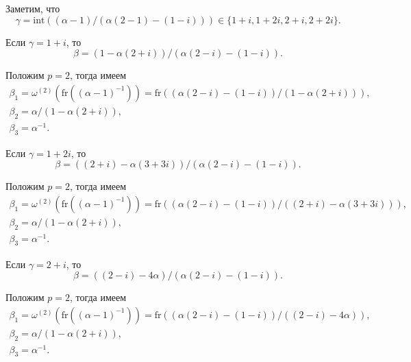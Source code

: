 \documentclass[_00_autoref.tex]{subfiles}
\begin{document}
\begin{example}
    Заметим, что
    \begin{equation*}
        \gamma=\textrm{int}((\alpha-1)/(\alpha(2-1)-(1-i)))\in\{1+i,1+2i,2+i,2+2i\}.
    \end{equation*}

    Если $\gamma=1+i$, то
    \begin{equation*}
        \beta=(1-\alpha(2+i))/(\alpha(2-i)-(1-i)).
    \end{equation*}

    Положим $p=2$, тогда имеем
    \begin{equation*}
        \begin{array}{c}
            \beta_1=\omega^{(2)}(\textrm{fr}((\alpha-1)^{-1}))=\textrm{fr}((\alpha(2-i)-(1-i))/(1-\alpha(2+i))),\\
            \beta_2=\alpha/(1-\alpha(2+i)),\\
            \beta_3=\alpha^{-1}.
        \end{array}
    \end{equation*}

    Если $\gamma=1+2i$, то
    \begin{equation*}
        \beta=((2+i)-\alpha(3+3i))/(\alpha(2-i)-(1-i)).
    \end{equation*}

    Положим $p=2$, тогда имеем
    \begin{equation*}
        \begin{array}{c}
            \beta_1=\omega^{(2)}(\textrm{fr}((\alpha-1)^{-1}))=\textrm{fr}((\alpha(2-i)-(1-i))/((2+i)-\alpha(3+3i))),\\
            \beta_2=\alpha/(1-\alpha(2+i)),\\
            \beta_3=\alpha^{-1}.
        \end{array}
    \end{equation*}

    Если $\gamma=2+i$, то
    \begin{equation*}
        \beta=((2-i)-4\alpha)/(\alpha(2-i)-(1-i)).
    \end{equation*}

    Положим $p=2$, тогда имеем
    \begin{equation*}
        \begin{array}{c}
            \beta_1=\omega^{(2)}(\textrm{fr}((\alpha-1)^{-1}))=\textrm{fr}((\alpha(2-i)-(1-i))/((2-i)-4\alpha)),\\
            \beta_2=\alpha/(1-\alpha(2+i)),\\
            \beta_3=\alpha^{-1}.
        \end{array}
    \end{equation*}


\end{example}
\end{document}
